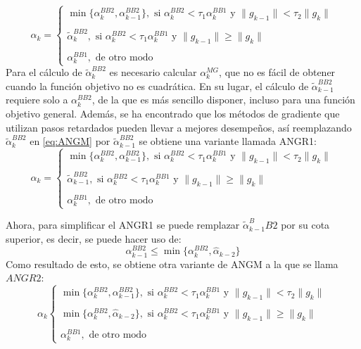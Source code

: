\begin{equation}
	\alpha_k =\begin{cases} \min\{\alpha_k^{BB2}, \alpha_{k-1}^{BB2}\}, \text{ \ si \ } \alpha_k^{BB2}<\tau_1\alpha_k^{BB1}\text{ \ y \ } \|g_{k-1}\|<\tau_2\|g_k\|\\\\
	\tilde{\alpha}_k^{BB2}, \text{ \ si \ } \alpha_k^{BB2} < \tau_1\alpha_k^{BB1} \text{ \ y \ } \|g_{k-1}\|\geq \|g_k\|\\\\
	\alpha_k^{BB1}, \text{ \ de otro modo \ }
	\end{cases}
	\label{eq:ANGM}
\end{equation}
Para el cálculo de $\tilde{\alpha}_k^{BB2}$ es necesario calcular $\alpha_k^{MG}$, que no es fácil de obtener cuando la función objetivo no es cuadrática. En su lugar, el cálculo de $\tilde{\alpha}_{k-1}^{BB2}$ requiere solo a $\alpha_k^{BB2} $, de la que es más sencillo disponer, incluso para una función objetivo general. Además, se ha encontrado que los métodos de gradiente que utilizan pasos retardados pueden llevar a mejores desempeños, así reemplazando $\tilde{\alpha}_k^{BB2}$ en \ref{eq:ANGM} por $\tilde{\alpha}_{k-1}^{BB2}$ se obtiene una variante llamada ANGR1:
\begin{equation}
	\alpha_k =\begin{cases} \min\{\alpha_k^{BB2}, \alpha_{k-1}^{BB2}\}, \text{ \ si \ } \alpha_k^{BB2}<\tau_1\alpha_k^{BB1}\text{ \ y \ } \|g_{k-1}\|<\tau_2\|g_k\|\\\\
		\tilde{\alpha}_{k-1}^{BB2}, \text{ \ si \ } \alpha_k^{BB2} < \tau_1\alpha_k^{BB1} \text{ \ y \ } \|g_{k-1}\|\geq \|g_k\|\\\\
	\alpha_k^{BB1}, \text{ \ de otro modo \ }
	\end{cases}
	\label{eq:ANGR1}
\end{equation}

Ahora, para simplificar el ANGR1 se puede remplazar $\tilde{\alpha}_{k-1}^BB2$ por su cota superior, es decir, se puede hacer uso de:
\begin{equation*}
	\alpha_{k-1}^{BB2}\leq \min{\{\alpha_k^{BB2}, \hat{\alpha}_{k-2}\}}
\end{equation*}
Como resultado de esto, se obtiene otra variante de ANGM a la que se llama $ANGR2$:
\begin{equation}
	\alpha_k \begin{cases} \min\{\alpha_k^{BB2}, \alpha_{k-1}^{BB2}\}, \text{ \ si \ } \alpha_k^{BB2}<\tau_1\alpha_k^{BB1}\text{ \ y \ } \|g_{k-1}\|<\tau_2\|g_k\|\\\\
		\min{\{\alpha_k^{BB2}, \hat{\alpha}_{k-2}\}}, \text{ \ si \ } \alpha_k^{BB2} < \tau_1\alpha_k^{BB1} \text{ \ y \ } \|g_{k-1}\|\geq \|g_k\|\\\\
	\alpha_k^{BB1}, \text{ \ de otro modo \ }
	\end{cases}
	\label{eq:ANGR2}
\end{equation}

